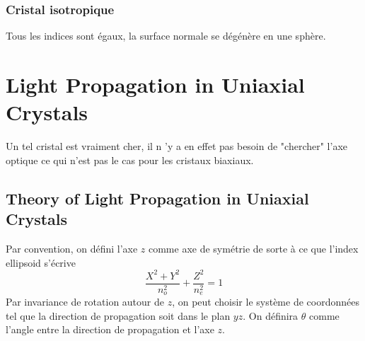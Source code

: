 \subsubsection{Cristal isotropique}
Tous les indices sont égaux, la surface normale se dégénère en une sphère.

\section{Light Propagation in Uniaxial Crystals}
Un tel cristal est vraiment cher, il n 'y a en effet pas besoin de "chercher" l'axe optique ce qui n'est
pas le cas pour les cristaux biaxiaux. 

\subsection{Theory of Light Propagation in Uniaxial Crystals}
Par convention, on défini l'axe $z$ comme axe de symétrie de sorte à ce que l'index ellipsoid s'écrive
\begin{equation}
\dfrac{X^2+Y^2}{n_o^2}+\dfrac{Z^2}{n_e^2}=1
\end{equation}
Par invariance de rotation autour de $z$, on peut choisir le système de coordonnées tel que la direction
de propagation soit dans le plan $yz$. On définira $\theta$ comme l'angle entre la direction de propagation
et l'axe $z$.

